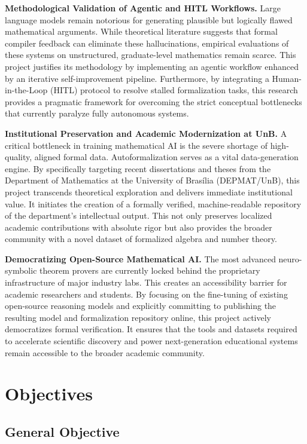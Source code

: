 \textbf{Methodological Validation of Agentic and HITL Workflows.} Large language models remain notorious for generating plausible but logically flawed mathematical arguments. While theoretical literature suggests that formal compiler feedback can eliminate these hallucinations, empirical evaluations of these systems on unstructured, graduate-level mathematics remain scarce. This project justifies its methodology by implementing an agentic workflow enhanced by an iterative self-improvement pipeline. Furthermore, by integrating a Human-in-the-Loop (HITL) protocol to resolve stalled formalization tasks, this research provides a pragmatic framework for overcoming the strict conceptual bottlenecks that currently paralyze fully autonomous systems.

\textbf{Institutional Preservation and Academic Modernization at UnB.} A critical bottleneck in training mathematical AI is the severe shortage of high-quality, aligned formal data. Autoformalization serves as a vital data-generation engine. By specifically targeting recent dissertations and theses from the Department of Mathematics at the University of Brasília (DEPMAT/UnB), this project transcends theoretical exploration and delivers immediate institutional value. It initiates the creation of a formally verified, machine-readable repository of the department's intellectual output. This not only preserves localized academic contributions with absolute rigor but also provides the broader community with a novel dataset of formalized algebra and number theory.

\textbf{Democratizing Open-Source Mathematical AI.} The most advanced neuro-symbolic theorem provers are currently locked behind the proprietary infrastructure of major industry labs. This creates an accessibility barrier for academic researchers and students. By focusing on the fine-tuning of existing open-source reasoning models and explicitly committing to publishing the resulting model and formalization repository online, this project actively democratizes formal verification. It ensures that the tools and datasets required to accelerate scientific discovery and power next-generation educational systems remain accessible to the broader academic community.

\section{Objectives}


\subsection{General Objective}

